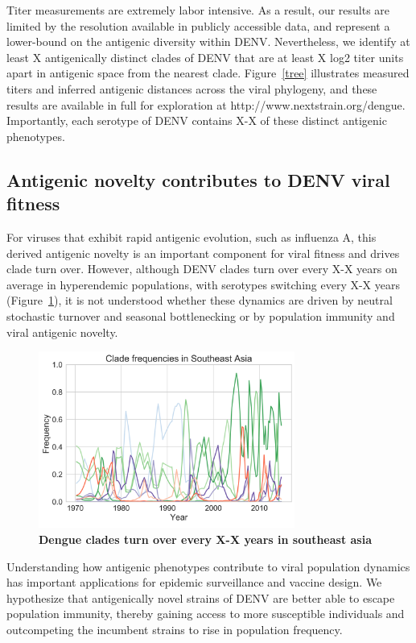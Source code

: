 \documentclass[11pt,oneside,letterpaper]{article}
\begin{document}
Titer measurements are extremely labor intensive.
As a result, our results are limited by the resolution available in publicly accessible data, and represent a lower-bound on the antigenic diversity within DENV.
Nevertheless, we identify at least X antigenically distinct clades of DENV that are at least X log2 titer units apart in antigenic space from the nearest clade.
Figure~\ref{tree} illustrates measured titers and inferred antigenic distances across the viral phylogeny, and these results are available in full for exploration at http://www.nextstrain.org/dengue.
Importantly, each serotype of DENV contains X-X of these distinct antigenic phenotypes.

\subsection*{Antigenic novelty contributes to DENV viral fitness}
For viruses that exhibit rapid antigenic evolution, such as influenza A, this derived antigenic novelty is an important component for viral fitness and drives clade turn over.
However, although DENV clades turn over every X-X years on average in hyperendemic populations, with serotypes switching every X-X years (Figure~\ref{frequencies_time}), it is not understood whether these dynamics are driven by neutral stochastic turnover and seasonal bottlenecking or by population immunity and viral antigenic novelty.

\begin{figure}[h]
 \centering
	\includegraphics[width=0.75\textwidth]{figs/frequencies_time.png}
	\caption{\textbf{
Dengue clades turn over every X-X years in southeast asia
}}
	\label{frequencies_time}
\end{figure}

Understanding how antigenic phenotypes contribute to viral population dynamics has important applications for epidemic surveillance and vaccine design.
We hypothesize that antigenically novel strains of DENV are better able to escape population immunity, thereby gaining access to more susceptible individuals and outcompeting the incumbent strains to rise in population frequency.
\end{document}
